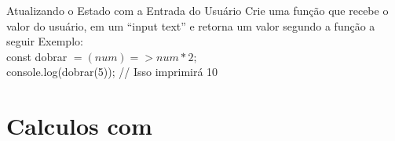 \documentclass[13pt, xcolor={dvipsnames,svgnames}, portuguese]{beamer}
\begin{document}
\begin{frame}{Atualizando o Estado com a Entrada do Usuário}
 Crie uma função que recebe o valor do usuário, em um “input text” e
retorna um valor segundo a função a seguir
Exemplo:\\
const dobrar $= (num) => num * 2;$\\
console.log(dobrar(5)); // Isso imprimirá 10
\end{frame}




\section{Calculos com }










\end{document}
